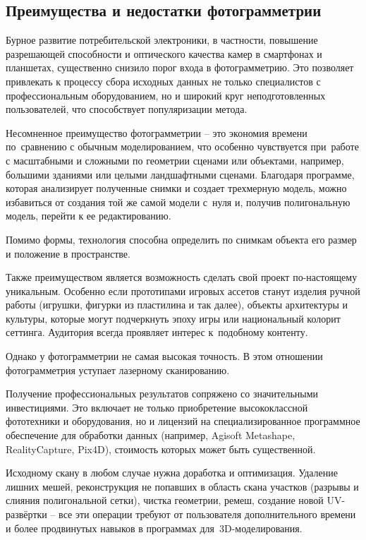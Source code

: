 \documentclass{ou}
\begin{document}
\subsection{Преимущества и недостатки фотограмметрии}
Бурное развитие потребительской электроники, в частности, повышение разрешающей способности и оптического качества камер в смартфонах и планшетах, существенно снизило порог входа в фотограмметрию. Это позволяет привлекать к процессу сбора исходных данных не только специалистов с профессиональным оборудованием, но и широкий круг неподготовленных пользователей, что способствует популяризации метода.

Несомненное преимущество фотограмметрии -- это экономия времени по~сравнению с обычным моделированием, что особенно чувствуется при~работе с масштабными и сложными по геометрии сценами или объектами, например, большими зданиями или целыми ландшафтными сценами. Благодаря программе, которая анализирует полученные снимки и создает трехмерную модель, можно избавиться от создания той же самой модели с~нуля и, получив полигональную модель, перейти к ее редактированию.

Помимо формы, технология способна определить по снимкам объекта его размер и положение в пространстве. 

Также преимуществом является возможность сделать свой проект по-настоящему уникальным. Особенно если прототипами игровых ассетов станут изделия ручной работы (игрушки, фигурки из пластилина и так далее), объекты архитектуры и культуры, которые могут подчеркнуть эпоху игры или национальный колорит сеттинга. Аудитория всегда проявляет интерес к~подобному контенту\cite{skillbox_fotogrammetriya}.

Однако у фотограмметрии не самая высокая точность. В этом отношении фотограмметрия уступает лазерному сканированию.

Получение профессиональных результатов сопряжено со значительными инвестициями. Это включает не только приобретение высококлассной фототехники и оборудования, но и лицензий на специализированное программное обеспечение для обработки данных (например, Agisoft Metashape, RealityCapture, Pix4D), стоимость которых может быть существенной\cite{sky_fotogrammetriya}.

Исходному скану в любом случае нужна доработка и оптимизация. Удаление лишних мешей, реконструкция не попавших в область скана участков (разрывы и слияния полигональной сетки), чистка геометрии, ремеш, создание новой UV-развёртки -- все эти операции требуют от пользователя дополнительного времени и более продвинутых навыков в программах для~3D-моделирования.
\end{document}
